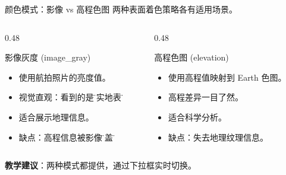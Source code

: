 \documentclass[aspectratio=169,11pt]{ctexbeamer}
\begin{document}
\begin{frame}{颜色模式：影像 vs 高程色图}
  两种表面着色策略各有适用场景。

  \begin{columns}
    \begin{column}{0.48\linewidth}
      \begin{block}{影像灰度 (image\_gray)}
        \begin{itemize}
          \item 使用航拍照片的亮度值。
          \item 视觉直观：看到的是\"真实地表\"。
          \item 适合展示地理信息。
          \item 缺点：高程信息被影像\"掩盖\"。
        \end{itemize}
      \end{block}
    \end{column}
    \begin{column}{0.48\linewidth}
      \begin{block}{高程色图 (elevation)}
        \begin{itemize}
          \item 使用高程值映射到 Earth 色图。
          \item 高程差异一目了然。
          \item 适合科学分析。
          \item 缺点：失去地理纹理信息。
        \end{itemize}
      \end{block}
    \end{column}
  \end{columns}

  \begin{center}
    \textbf{教学建议}：两种模式都提供，通过下拉框实时切换。
  \end{center}
\end{frame}
\end{document}
